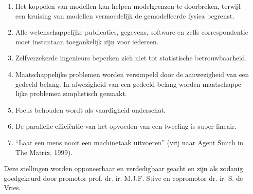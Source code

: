 \documentclass[headinclude,footinclude,cleardoublepage=empty,
numbers=noenddot,fontsize=9pt]{scrbook}
\begin{document}
\begin{titlepage}
\begin{otherlanguage}{dutch}
\begin{enumerate}
    \item Het koppelen van modellen kan helpen modelgrenzen te
      doorbreken, terwijl een kruising van modellen vermoedelijk de
      gemodelleerde fysica begrenst.
      
    \item Alle wetenschappelijke publicaties, gegevens, software en
      zelfs correspondentie moet instantaan toegankelijk zijn voor
      iedereen.
      
    \item Zelfverzekerde ingenieurs beperken zich niet tot
      statistische betrouwbaarheid.
      
    \item Maatschappelijke problemen worden versimpeld door de
      aanwezigheid van een gedeeld belang. In afwezigheid van een
      gedeeld belang worden maatschappelijke problemen simplistisch
      gemaakt.

    \item Focus behouden wordt als vaardigheid onderschat.
      
    \item De parallelle effici\"{e}ntie van het opvoeden van een
      tweeling is super-lineair.
      
    \item ``Laat een mens nooit een machinetaak uitvoeren'' (vrij naar
      Agent Smith in The Matrix, 1999).
      
    \end{enumerate}
    
    \vfill
    
    \noindent Deze stellingen worden opponeerbaar en verdedigbaar
    geacht en zijn als zodanig goedgekeurd door promotor
    prof. dr. ir. M.J.F. Stive en copromotor dr. ir. S. de Vries.

  \end{otherlanguage}
  
\end{titlepage}

\newpage

\begingroup
\color{Maroon}
\endgroup
\end{document}
